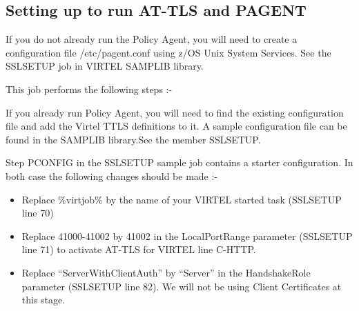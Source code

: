 \documentclass[letterpaper,10pt,english]{sphinxmanual}
\begin{document}
\subsection{Setting up to run AT-TLS and PAGENT}
\label{\detokenize{TN202002:setting-up-to-run-at-tls-and-pagent}}
If you do not already run the Policy Agent, you will need to create a configuration file /etc/pagent.conf using z/OS Unix System Services. See the SSLSETUP job in VIRTEL SAMPLIB library.

This job performs the following steps :-

\begin{sphinxVerbatim}[commandchars=\\\{\}]
        
        
         
         
        
            
           
          
\end{sphinxVerbatim}

If you already run Policy Agent, you will need to find the existing configuration file and add the Virtel TTLS definitions to it. A sample configuration file can be found in the SAMPLIB library.See the member SSLSETUP.

Step PCONFIG in the SSLSETUP sample job contains a starter configuration. In both case the following changes should be made :-
\begin{itemize}
\item {} 
Replace \%virtjob\% by the name of your VIRTEL started task (SSLSETUP line 70)

\item {} 
Replace 41000-41002 by 41002 in the LocalPortRange parameter (SSLSETUP line 71) to activate AT-TLS for VIRTEL line C-HTTP.

\item {} 
Replace “ServerWithClientAuth” by “Server” in the HandshakeRole parameter (SSLSETUP line 82). We will not be using Client Certificates at this stage.

\end{itemize}
\end{document}
